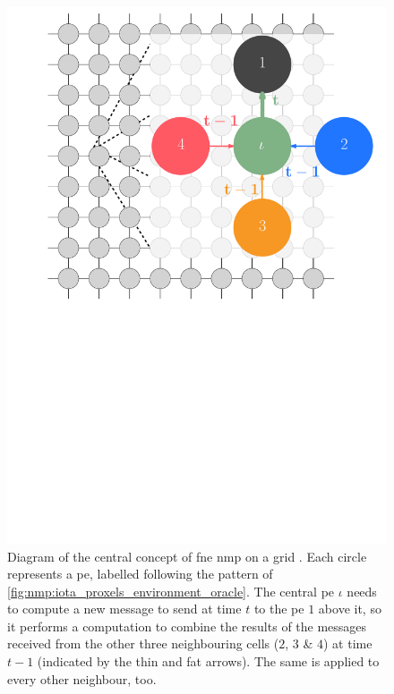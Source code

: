 \begin{figure}
    \centering
    \includegraphics[keepaspectratio,width=1.0\linewidth]{chapters/nmp/images/bp_diagram_recoloured_iotacentre.pdf}
    \caption[Diagram of the central concept of \gls{fne}  on a grid]{Diagram of the central concept of \gls{fne} \gls{nmp} on a grid \cite{lbpmpsmpic}.  Each circle represents a \gls{pe}, labelled following the pattern of \cref{fig:nmp:iota_proxels_environment_oracle}.  The central \gls{pe} \(\iota\) needs to compute a new message to send at time \(t\) to the \gls{pe} \(1\) above it, so it performs a computation to combine the results of the messages received from the other three neighbouring cells (\(2\), \(3\) \& \(4\)) at time \(t - 1\) (indicated by the thin and fat arrows).  The same is applied to every other neighbour, too.}
    \label{fig:nmp:gridmessaging}
\end{figure}

